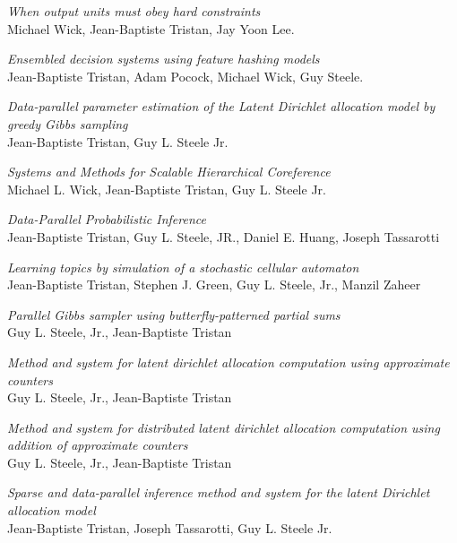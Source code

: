\documentclass[margin,line]{res}
\begin{document}
\begin{resume}
\emph{When output units must obey hard constraints}\\
Michael Wick, Jean-Baptiste Tristan, Jay Yoon Lee.  
  
\emph{Ensembled decision systems using feature hashing models}\\
Jean-Baptiste Tristan, Adam Pocock, Michael Wick, Guy Steele.

\emph{Data-parallel parameter estimation of the Latent Dirichlet allocation model by greedy Gibbs sampling}\\
Jean-Baptiste Tristan, Guy L. Steele Jr.

\emph{Systems and Methods for Scalable Hierarchical Coreference}\\
Michael L. Wick, Jean-Baptiste Tristan, Guy L. Steele Jr.

\emph{Data-Parallel Probabilistic Inference}\\
Jean-Baptiste Tristan, Guy L. Steele, JR., Daniel E. Huang, Joseph Tassarotti

\emph{Learning topics by simulation of a stochastic cellular automaton}\\
Jean-Baptiste Tristan, Stephen J. Green, Guy L. Steele, Jr., Manzil Zaheer

\emph{Parallel Gibbs sampler using butterfly-patterned partial sums}\\
Guy L. Steele, Jr., Jean-Baptiste Tristan

\emph{Method and system for latent dirichlet allocation computation using approximate counters}\\
Guy L. Steele, Jr., Jean-Baptiste Tristan

\emph{Method and system for distributed latent dirichlet allocation computation using addition of approximate counters}\\
Guy L. Steele, Jr., Jean-Baptiste Tristan

\emph{Sparse and data-parallel inference method and system for the latent Dirichlet allocation model}\\
Jean-Baptiste Tristan, Joseph Tassarotti, Guy L. Steele Jr.

\end{resume}
\end{document}
